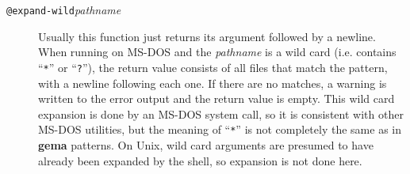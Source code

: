 \begin{description}
\item[{\tt @expand-wild\ttlb}{\it pathname}{\tt \ttrb}]
Usually this function just returns its argument followed by a newline.
When running on MS-DOS and the {\it pathname} is a wild card (i.e. contains
``\verb/*/'' or ``\verb/?/''), the return value consists of all files
that match the pattern, with a newline following each one.  If there are
no matches, a warning is written to the error output and the return value
is empty.  This wild card expansion is done by an MS-DOS system call, so it
is consistent with other MS-DOS utilities, but the meaning of ``\verb/*/''
is not completely the same as in {\bf gema} patterns.
On Unix, wild card arguments are presumed to have already been expanded by
the shell, so expansion is not done here.

\end{description}

